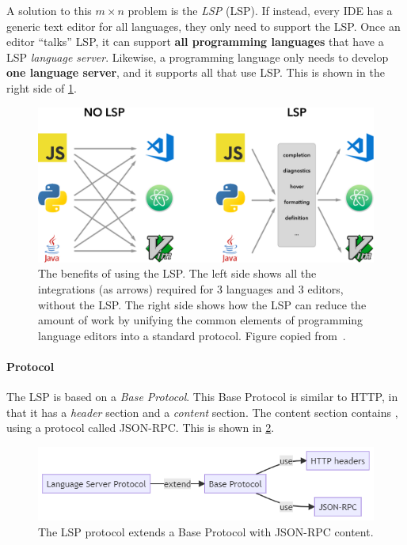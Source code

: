 A solution to this $m\times{}n$ problem is the \textit{\acrlong{LSP}} (\acrshort{LSP}).
If instead, every \acrshort{IDE} has a generic text editor for all languages, they only need to support the \acrshort{LSP}.
Once an editor ``talks'' \acrshort{LSP}, it can support \textbf{all programming languages} that have a \acrshort{LSP} \textit{language server}.
Likewise, a programming language only needs to develop \textbf{one language server}, and it supports all  that use \acrshort{LSP}.
This is shown in the right side of \cref{fig:lsp-m-times-n}.

\begin{figure}[htbp]  %
  \centering
  \includegraphics[width=\textwidth]{figures/pre-project/lsp-languages-editors.png}
  \caption[The Language Server Protocol Benefits]{The benefits of using the \acrshort{LSP}. The left side shows all the integrations (as arrows) required for 3 languages and 3 editors, without the \acrshort{LSP}.
  The right side shows how the \acrshort{LSP} can reduce the amount of work by unifying the common elements of programming language editors into a standard protocol. Figure copied from~\textcite{microsoftLanguageServerExtension2020}.}\label{fig:lsp-m-times-n}
\end{figure}

\paragraph{Protocol}
The \acrlong{LSP} is based on a \textit{Base Protocol}.
This Base Protocol is similar to HTTP, in that it has a \textit{header} section and a \textit{content} section.
The content section contains , using a protocol called \gls{JSON-RPC}.
This is shown in \cref{fig:lsp-architecture}.

\begin{figure}[htbp]  %
  \centering
  \includegraphics[width=\textwidth]{figures/pre-project/lsp-protocol.png}
  \caption[LSP Protocol Design]{The \acrlong{LSP} protocol extends a Base Protocol with JSON-RPC content.}\label{fig:lsp-architecture}
\end{figure}

